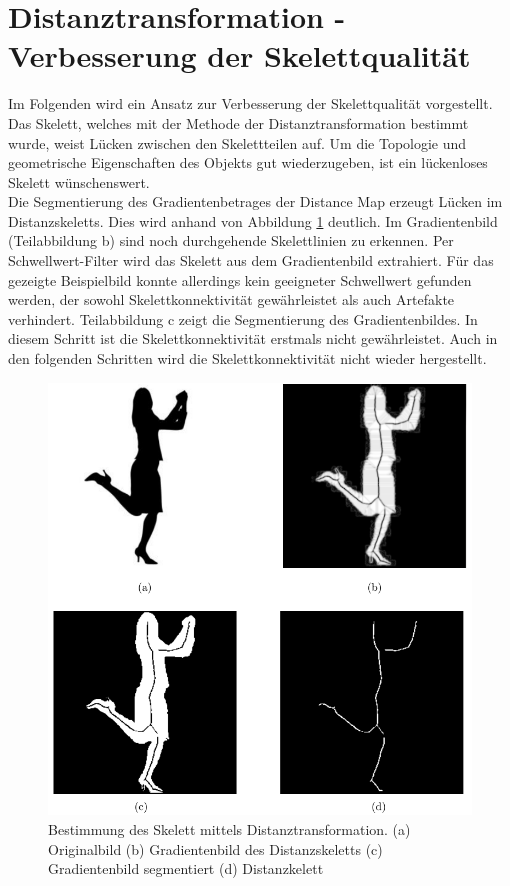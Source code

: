 \section{Distanztransformation - Verbesserung der Skelettqualität}
\label{sec:verbesserung}
Im Folgenden wird ein Ansatz zur Verbesserung der Skelettqualität
vorgestellt. \\
Das Skelett, welches mit der Methode der Distanztransformation bestimmt wurde, weist Lücken zwischen den Skelettteilen auf. Um die Topologie und geometrische Eigenschaften des Objekts gut wiederzugeben, ist ein lückenloses Skelett wünschenswert. \\
Die Segmentierung des Gradientenbetrages der Distance Map erzeugt Lücken im Distanzskeletts. Dies wird anhand von Abbildung \ref{fig:person-skelett} deutlich. Im Gradientenbild (Teilabbildung b) sind noch durchgehende Skelettlinien zu erkennen. Per Schwellwert-Filter wird das Skelett aus dem Gradientenbild extrahiert. Für das gezeigte Beispielbild konnte allerdings kein geeigneter Schwellwert gefunden werden, der sowohl Skelettkonnektivität gewährleistet als auch Artefakte verhindert. Teilabbildung c zeigt die Segmentierung des Gradientenbildes. In diesem Schritt ist die Skelettkonnektivität erstmals nicht gewährleistet. Auch in den folgenden Schritten wird die Skelettkonnektivität nicht wieder hergestellt. 
\begin{figure}[htbp]
\centering
\includegraphics[width=1.0\linewidth]{./fig/person_gradienten_problem.pdf}
\caption{Bestimmung des Skelett mittels Distanztransformation. (a) Originalbild (b) Gradientenbild des Distanzskeletts (c) Gradientenbild segmentiert (d) Distanzkelett}
\label{fig:person-skelett}
\end{figure}\\
